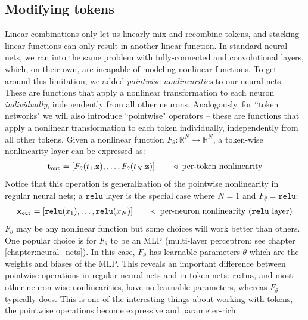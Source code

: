 \subsection{Modifying tokens}\label{sec:transformers:modifying_tokens}
Linear combinations only let us linearly mix and recombine tokens, and stacking linear functions can only result in another linear function. In standard neural nets, we ran into the same problem with fully-connected and convolutional layers, which, on their own, are incapable of modeling nonlinear functions. To get around this limitation, we added \textit{pointwise nonlinearities} to our neural nets. These are functions that apply a nonlinear transformation to each neuron \textit{individually}, independently from all other neurons. Analogously, for ``token networks" we will also introduce ``pointwise" operators -- these are functions that apply a nonlinear transformation to each token individually, independently from all other tokens. Given a nonlinear function $F_{\theta}: \mathbb{R}^N \rightarrow \mathbb{R}^N$, a token-wise nonlinearity layer can be expressed as:
\begin{align}
    \mathbf{t}_{\texttt{out}} = [F_{\theta}(t_1.\mathbf{z}), \ldots, F_{\theta}(t_N.\mathbf{z})] \quad\quad \triangleleft \text{ per-token nonlinearity}
\end{align}
Notice that this operation is generalization of the pointwise nonlinearity in regular neural nets; a $\texttt{relu}$ layer is the special case where $N=1$ and $F_{\theta} = \texttt{relu}$:
\begin{align}
    \mathbf{x}_{\texttt{out}} = [\texttt{relu}(x_1), \ldots,\texttt{relu}(x_N)] \quad\quad \triangleleft \text{ per-neuron nonlinearity (\texttt{relu} layer)}
\end{align}
$F_{\theta}$ may be any nonlinear function but some choices will work better than others. One popular choice is for $F_{\theta}$ to be an MLP (multi-layer perceptron; see chapter \ref{chapter:neural_nets}). In this case, $F_{\theta}$ has learnable parameters $\theta$ which are the weights and biases of the MLP. This reveals an important difference between pointwise operations in regular neural nets and in token nets: $\texttt{relus}$, and most other neuron-wise nonlinearities, have no learnable parameters, whereas $F_{\theta}$ typically does. This is one of the interesting things about working with tokens, the pointwise operations become expressive and parameter-rich.

